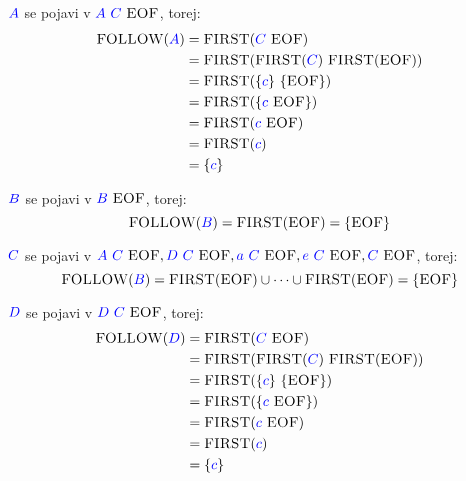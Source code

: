 \documentclass{article}
\newcommand{\FIRST}{\textsc{FIRST}}
\newcommand{\FOLLOW}{\textsc{FOLLOW}}
\newcommand{\EOF}{\textsc{EOF}}
\newcommand{\Symbol}[1]{\textcolor{blue}{#1}}
\newcommand{\Seq}{\ }
\begin{document}
$\Symbol{A}$ se pojavi v $\Symbol{A} \Seq \Symbol{C} \Seq \EOF$, torej:
\begin{align*}
  \FOLLOW(\Symbol{A}) &= \FIRST(\Symbol{C} \Seq \EOF) \\
             &= \FIRST(\FIRST(\Symbol{C}) \Seq \FIRST(\EOF))\\
             &= \FIRST(\{\Symbol{c}\} \Seq \{\EOF\})\\
             &= \FIRST(\{\Symbol{c} \Seq \EOF\})\\
             &= \FIRST(\Symbol{c} \Seq \EOF) \\
             &= \FIRST(\Symbol{c})\\
             &= \{\Symbol{c}\}
\end{align*}

$\Symbol{B}$ se pojavi v $\Symbol{B} \Seq \EOF$, torej:
\begin{equation*}
  \FOLLOW(\Symbol{B}) = \FIRST(\EOF) = \{\EOF\}
\end{equation*}

$\Symbol{C}$ se pojavi v $\Symbol{A} \Seq \Symbol{C} \Seq \EOF, \Symbol{D} \Seq \Symbol{C} \Seq \EOF, \Symbol{a} \Seq \Symbol{C} \Seq \EOF, \Symbol{e} \Seq \Symbol{C} \Seq \EOF, \Symbol{C} \Seq \EOF$, torej:
\begin{equation*}
  \FOLLOW(\Symbol{B}) = \FIRST(\EOF) \cup \dots \cup \FIRST(\EOF) = \{\EOF\}
\end{equation*}

$\Symbol{D}$ se pojavi v $\Symbol{D} \Seq \Symbol{C} \Seq \EOF$, torej:
\begin{align*}
  \FOLLOW(\Symbol{D}) &= \FIRST(\Symbol{C} \Seq \EOF) \\
             &= \FIRST(\FIRST(\Symbol{C}) \Seq \FIRST(\EOF))\\
             &= \FIRST(\{\Symbol{c}\} \Seq \{\EOF\})\\
             &= \FIRST(\{\Symbol{c} \Seq \EOF\})\\
             &= \FIRST(\Symbol{c} \Seq \EOF) \\
             &= \FIRST(\Symbol{c})\\
             &= \{\Symbol{c}\}
\end{align*}
\end{document}
